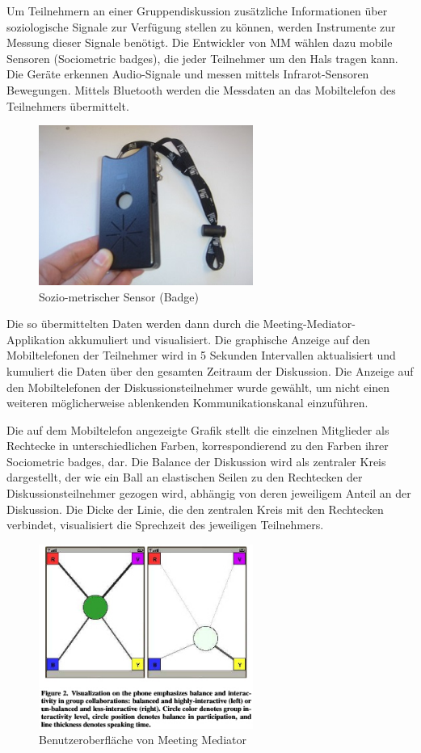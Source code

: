 Um Teilnehmern an einer Gruppendiskussion zusätzliche
Informationen über soziologische Signale zur Verfügung stellen zu können, werden 
Instrumente zur Messung dieser Signale benötigt. Die Entwickler von MM wählen dazu mobile
Sensoren (Sociometric badges), die jeder Teilnehmer um den Hals tragen kann.
Die Geräte erkennen Audio-Signale und messen mittels Infrarot-Sensoren
Bewegungen. Mittels Bluetooth werden die Messdaten an das Mobiltelefon des
Teilnehmers übermittelt. 

\begin{figure}[htp]
\centering
\includegraphics[width=7cm]{sociometricbadge.jpg}
\caption{Sozio-metrischer Sensor (Badge)}
\end{figure}

Die so übermittelten Daten werden dann durch die
Meeting-Mediator-Applikation akkumuliert und visualisiert.
Die graphische Anzeige auf den Mobiltelefonen der Teilnehmer wird in 5 Sekunden
Intervallen aktualisiert und kumuliert die Daten über den gesamten Zeitraum der Diskussion.
Die Anzeige auf den Mobiltelefonen der Diskussionsteilnehmer wurde gewählt, um
nicht einen weiteren möglicherweise ablenkenden Kommunikationskanal einzuführen.

Die auf dem Mobiltelefon angezeigte Grafik stellt die einzelnen Mitglieder als
Rechtecke in unterschiedlichen Farben, korrespondierend zu den Farben ihrer
Sociometric badges, dar. Die Balance der Diskussion wird als zentraler Kreis dargestellt, der wie
ein Ball an elastischen Seilen zu den Rechtecken der Diskussionsteilnehmer
gezogen wird, abhängig von deren jeweiligem Anteil an der Diskussion. Die Dicke
der Linie, die den zentralen Kreis mit den Rechtecken verbindet, visualisiert die Sprechzeit des jeweiligen Teilnehmers. 
\begin{figure}[htp]
\centering
\includegraphics[width=7cm]{mm.jpg}
\caption{Benutzeroberfläche von Meeting Mediator}
\end{figure}
